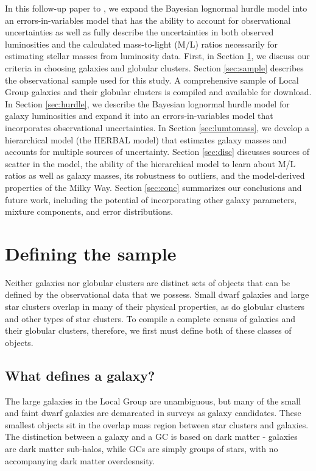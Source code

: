 \documentclass[twocolumn]{aastex631}
\begin{document}
In this follow-up paper to , we expand the Bayesian lognormal hurdle model into an errors-in-variables model that has the ability to account for observational uncertainties as well as fully describe the uncertainties in both observed luminosities and the calculated mass-to-light (M/L) ratios necessarily for estimating stellar masses from luminosity data. First, in Section \ref{sec:definitions}, we discuss our criteria in choosing galaxies and globular clusters. Section \ref{sec:sample} describes the observational sample used for this study. A comprehensive sample of Local Group galaxies and their globular clusters is compiled and available for download. In Section \ref{sec:hurdle}, we describe the Bayesian lognormal hurdle model for galaxy luminosities and expand it into an errors-in-variables model that incorporates observational uncertainties. In Section \ref{sec:lumtomass}, we develop a hierarchical model (the HERBAL model) that estimates galaxy masses and accounts for multiple sources of uncertainty. Section \ref{sec:disc} discusses sources of scatter in the model, the ability of the hierarchical model to learn about M/L ratios as well as galaxy masses, its robustness to outliers, and the model-derived properties of the Milky Way. Section \ref{sec:conc} summarizes our conclusions and future work, including the potential of incorporating other galaxy parameters, mixture components, and error distributions. 

\section{Defining the sample} \label{sec:definitions}

Neither galaxies nor globular clusters are distinct sets of objects that can be defined by the observational data that we possess. Small dwarf galaxies and large star clusters overlap in many of their physical properties, as do globular clusters and other types of star clusters. To compile a complete census of galaxies and their globular clusters, therefore, we first must define both of these classes of objects. 

\subsection{What defines a galaxy?} \label{subsec:galaxydef}

The large galaxies in the Local Group are unambiguous, but many of the small and faint dwarf galaxies are demarcated in surveys as galaxy candidates. These smallest objects sit in the overlap mass region between star clusters and galaxies. The distinction between a galaxy and a GC is based on dark matter - galaxies are dark matter sub-halos, while GCs are simply groups of stars, with no accompanying dark matter overdesnsity.
\end{document}
